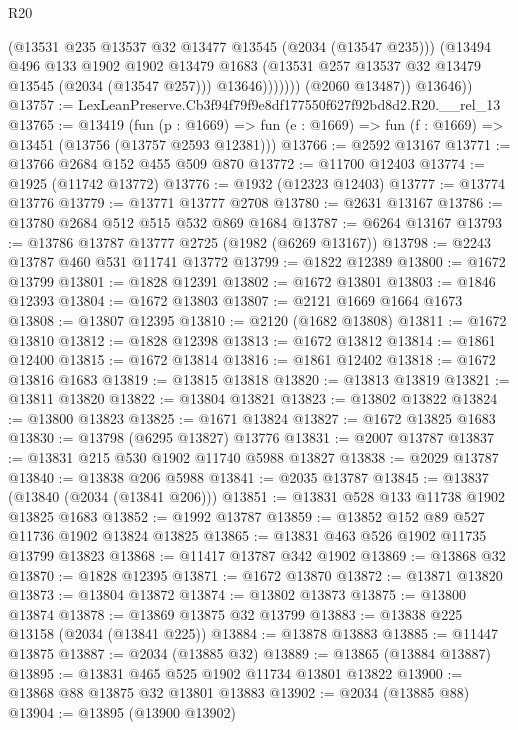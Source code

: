 \begin{lexlean}{R20}
\begin{coremodule}
                      (@13531 @235 @13537 @32 @13477 @13545 (@2034 (@13547 @235)))
                      (@13494
                        @496
                        @133
                        @1902
                        @1902
                        @13479
                        @1683
                        (@13531 @257 @13537 @32 @13479 @13545 (@2034 (@13547 @257)))
                        @13646)))))))
          (@2060 @13487))
        @13646))
@13757 := LexLeanPreserve.Cb3f94f79f9e8df177550f627f92bd8d2.R20.__rel_13
@13765 := @13419
    (fun (p : @1669) => fun (e : @1669) => fun (f : @1669) => @13451 (@13756 (@13757 @2593 @12381)))
@13766 := @2592 @13167
@13771 := @13766 @2684 @152 @455 @509 @870
@13772 := @11700 @12403
@13774 := @1925 (@11742 @13772)
@13776 := @1932 (@12323 @12403)
@13777 := @13774 @13776
@13779 := @13771 @13777 @2708
@13780 := @2631 @13167
@13786 := @13780 @2684 @512 @515 @532 @869 @1684
@13787 := @6264 @13167
@13793 := @13786 @13787 @13777 @2725 (@1982 (@6269 @13167))
@13798 := @2243 @13787 @460 @531 @11741 @13772
@13799 := @1822 @12389
@13800 := @1672 @13799
@13801 := @1828 @12391
@13802 := @1672 @13801
@13803 := @1846 @12393
@13804 := @1672 @13803
@13807 := @2121 @1669 @1664 @1673
@13808 := @13807 @12395
@13810 := @2120 (@1682 @13808)
@13811 := @1672 @13810
@13812 := @1828 @12398
@13813 := @1672 @13812
@13814 := @1861 @12400
@13815 := @1672 @13814
@13816 := @1861 @12402
@13818 := @1672 @13816 @1683
@13819 := @13815 @13818
@13820 := @13813 @13819
@13821 := @13811 @13820
@13822 := @13804 @13821
@13823 := @13802 @13822
@13824 := @13800 @13823
@13825 := @1671 @13824
@13827 := @1672 @13825 @1683
@13830 := @13798 (@6295 @13827) @13776
@13831 := @2007 @13787
@13837 := @13831 @215 @530 @1902 @11740 @5988 @13827
@13838 := @2029 @13787
@13840 := @13838 @206 @5988
@13841 := @2035 @13787
@13845 := @13837 (@13840 (@2034 (@13841 @206)))
@13851 := @13831 @528 @133 @11738 @1902 @13825 @1683
@13852 := @1992 @13787
@13859 := @13852 @152 @89 @527 @11736 @1902 @13824 @13825
@13865 := @13831 @463 @526 @1902 @11735 @13799 @13823
@13868 := @11417 @13787 @342 @1902
@13869 := @13868 @32
@13870 := @1828 @12395
@13871 := @1672 @13870
@13872 := @13871 @13820
@13873 := @13804 @13872
@13874 := @13802 @13873
@13875 := @13800 @13874
@13878 := @13869 @13875 @32 @13799
@13883 := @13838 @225 @13158 (@2034 (@13841 @225))
@13884 := @13878 @13883
@13885 := @11447 @13875
@13887 := @2034 (@13885 @32)
@13889 := @13865 (@13884 @13887)
@13895 := @13831 @465 @525 @1902 @11734 @13801 @13822
@13900 := @13868 @88 @13875 @32 @13801 @13883
@13902 := @2034 (@13885 @88)
@13904 := @13895 (@13900 @13902)

\end{coremodule}
\end{lexlean}
